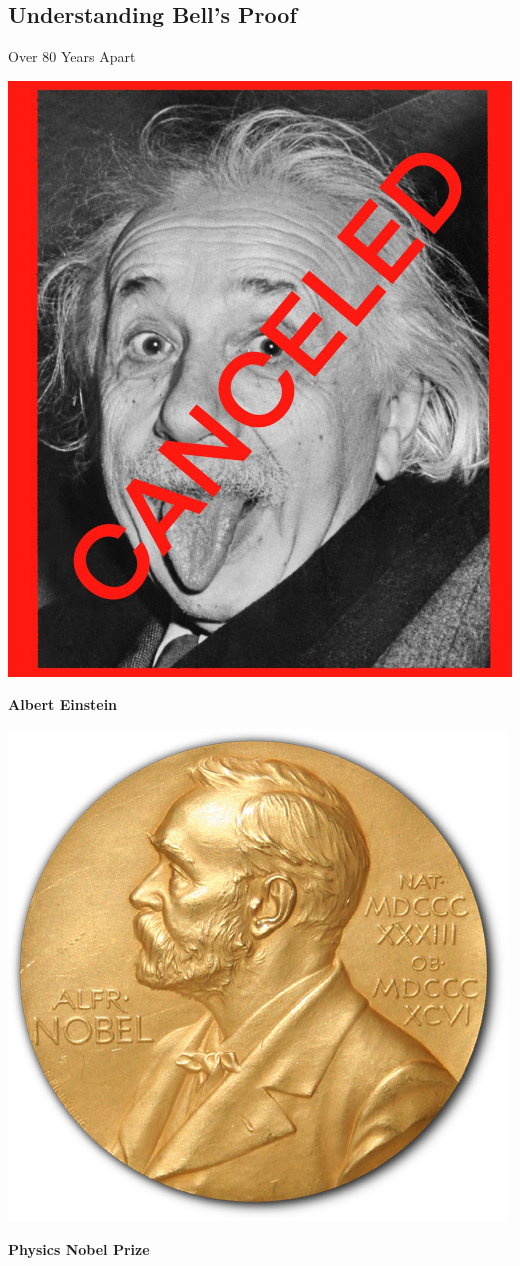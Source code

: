 \subsection{Understanding Bell's Proof}
\begin{frame}{Over 80 Years Apart}
  \begin{minipage}{0.48\textwidth}
    \centering
    \includegraphics[width=0.8\linewidth]{images/einstein.jpeg}
    \par\vspace{0.2cm}
    \textbf{Albert Einstein}
  \end{minipage}
  \hfill
  \begin{minipage}{0.48\textwidth}
    \centering
    \includegraphics[width=0.8\linewidth]{images/nobel.png}
    \par\vspace{0.2cm}
    \textbf{Physics Nobel Prize}
  \end{minipage}
\end{frame}


